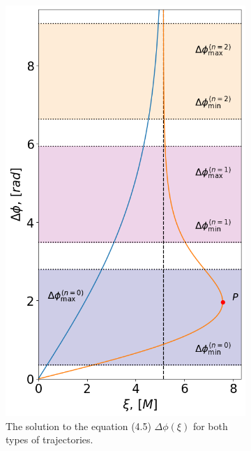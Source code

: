 \documentclass[12pt]{article}
\numberwithin{equation}{section}
\numberwithin{figure}{section}
\begin{document}
	\begin{figure}[h]
		\centering
		\begin{subfigure}{6cm}
			\centering
			\includegraphics[scale = 0.3]{Section_6_Morphology_of_the images_of_horizonless_spacetimes/WH_70_deg_r6_impact_gamma_2.png}
			\caption{The solution to the equation (4.5) $\Delta\phi(\xi)$ for both types of trajectories.} \label{fig:1a}
		\end{subfigure}\,\,\,
		\begin{subfigure}{8cm}
			\hspace{-0.25cm}

\end{subfigure}
\end{figure}
\end{document}

